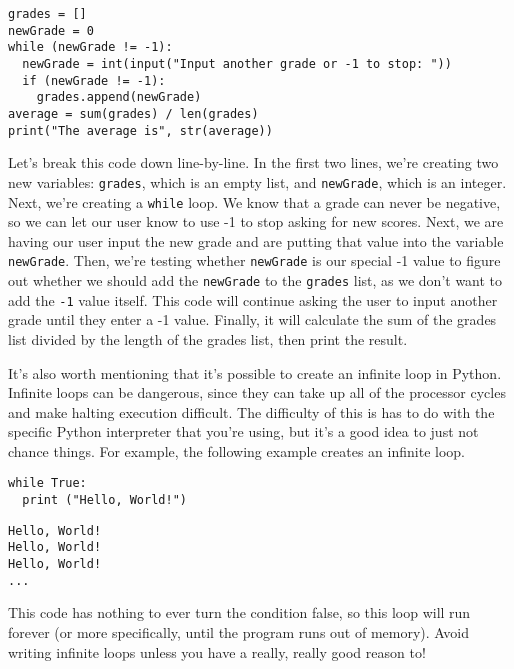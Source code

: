 \begin{lstlisting}[style=pippython]
grades = []
newGrade = 0
while (newGrade != -1):
  newGrade = int(input("Input another grade or -1 to stop: "))
  if (newGrade != -1):
    grades.append(newGrade)
average = sum(grades) / len(grades)
print("The average is", str(average))
\end{lstlisting}
Let's break this code down line-by-line. In the first two lines, we're creating two new variables: \verb|grades|, which is an empty list, and \verb|newGrade|, which is an integer. Next, we're creating a \verb|while| loop. We know that a grade can never be negative, so we can let our user know to use -1 to stop asking for new scores. Next, we are having our user input the new grade and are putting that value into the variable \verb|newGrade|. Then, we're testing whether \verb|newGrade| is our special -1 value to figure out whether we should add the \verb|newGrade| to the \verb|grades| list, as we don't want to add the \verb|-1| value itself. This code will continue asking the user to input another grade until they enter a -1 value. Finally, it will calculate the sum of the grades list divided by the length of the grades list, then print the result.\par
It's also worth mentioning that it's possible to create an infinite loop in Python. Infinite loops can be dangerous, since they can take up all of the processor cycles and make halting execution difficult. The difficulty of this is has to do with the specific Python interpreter that you're using, but it's a good idea to just not chance things. For example, the following example creates an infinite loop.\par
\begin{lstlisting}[style=pippython]
while True:
  print ("Hello, World!")
\end{lstlisting}
\begin{lstlisting}
Hello, World!
Hello, World!
Hello, World!
...
\end{lstlisting}
This code has nothing to ever turn the condition false, so this loop will run forever (or more specifically, until the program runs out of memory). Avoid writing infinite loops unless you have a really, really good reason to!\par
{}\par
